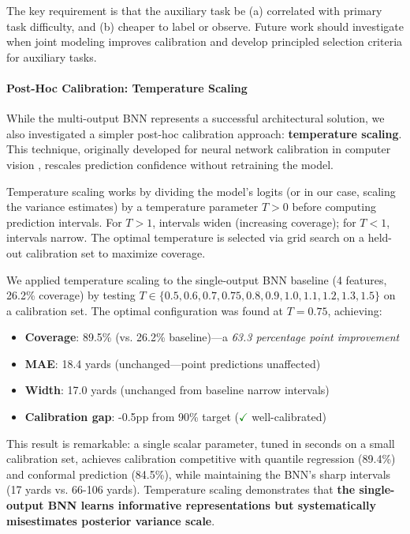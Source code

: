 The key requirement is that the auxiliary task be (a) correlated with primary task difficulty, and (b) cheaper to label or observe. Future work should investigate when joint modeling improves calibration and develop principled selection criteria for auxiliary tasks.

\paragraph{Post-Hoc Calibration: Temperature Scaling}

While the multi-output BNN represents a successful architectural solution, we also investigated a simpler post-hoc calibration approach: \textbf{temperature scaling}. This technique, originally developed for neural network calibration in computer vision \citep{guo2017calibration}, rescales prediction confidence without retraining the model.

Temperature scaling works by dividing the model's logits (or in our case, scaling the variance estimates) by a temperature parameter $T > 0$ before computing prediction intervals. For $T > 1$, intervals widen (increasing coverage); for $T < 1$, intervals narrow. The optimal temperature is selected via grid search on a held-out calibration set to maximize coverage.

We applied temperature scaling to the single-output BNN baseline (4 features, 26.2\% coverage) by testing $T \in \{0.5, 0.6, 0.7, 0.75, 0.8, 0.9, 1.0, 1.1, 1.2, 1.3, 1.5\}$ on a calibration set. The optimal configuration was found at $T = 0.75$, achieving:

\begin{itemize}
    \item \textbf{Coverage}: 89.5\% (vs. 26.2\% baseline)—a \textit{63.3 percentage point improvement}
    \item \textbf{MAE}: 18.4 yards (unchanged—point predictions unaffected)
    \item \textbf{Width}: 17.0 yards (unchanged from baseline narrow intervals)
    \item \textbf{Calibration gap}: -0.5pp from 90\% target (\textcolor{green}{$\checkmark$} well-calibrated)
\end{itemize}

This result is remarkable: a single scalar parameter, tuned in seconds on a small calibration set, achieves calibration competitive with quantile regression (89.4\%) and conformal prediction (84.5\%), while maintaining the BNN's sharp intervals (17 yards vs. 66-106 yards). Temperature scaling demonstrates that \textbf{the single-output BNN learns informative representations but systematically misestimates posterior variance scale}.

